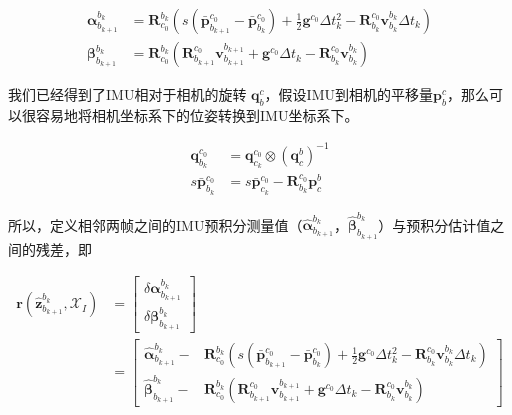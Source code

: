 \documentclass[12pt,a4paper]{article}
\begin{document}
\begin{equation}
\begin{aligned}
\boldsymbol{\alpha}^{b_{k}}_{b_{k+1}} 
&= 
\mathbf{R}^{b_{k}}_{c_{0}}
\left(
s(\bar{\mathbf{p}}^{c_{0}}_{b_{k+1}} - \bar{\mathbf{p}}^{c_{0}}_{b_{k}}) +
\frac{1}{2}\mathbf{g}^{c_{0}} \Delta t_{k}^{2} -
\mathbf{R}^{c_0}_{b_k} \mathbf{v}^{b_k}_{b_{k}} \Delta t_{k} 
\right) 
\\
\boldsymbol{\beta}^{b_{k}}_{b_{k+1}} &=
\mathbf{R}^{b_{k}}_{c_{0}}
\left(
\mathbf{R}^{c_0}_{b_{k+1}} \mathbf{v}^{b_{k+1}}_{b_{k+1}} +
\mathbf{g}^{c_{0}}\Delta t_{k} - \mathbf{R}^{c_0}_{b_k} \mathbf{v}^{b_k}_{b_{k}}
\right)
\end{aligned}
\end{equation}

我们已经得到了IMU相对于相机的旋转 $\mathbf{q}_{b}^{c}$，假设IMU到相机的平移量$\mathbf{p}_{b}^{c}$，那么可以很容易地将相机坐标系下的位姿转换到IMU坐标系下。

\begin{equation}
\begin{aligned}
\mathbf{q}_{b_{k}}^{c_{0}} &=
\mathbf{q}^{c_{0}}_{c_{k}} \otimes (\mathbf{q}_{c}^{b})^{-1}  \\
s \bar{\mathbf{p}}^{c_{0}}_{b_{k}} &=
s \bar{\mathbf{p}}^{c_{0}}_{c_{k}} - \mathbf{R}^{c_{0}}_{b_{k}} \mathbf{p}_{c}^{b}
\end{aligned}
\end{equation}

所以，定义相邻两帧之间的IMU预积分测量值（${\hat{\boldsymbol{\alpha}}}_{b_{k+1}}^{b_{k}}$，${\hat{\boldsymbol{\beta}}}_{b_{k+1}}^{b_{k}}$）与预积分估计值之间的残差，即

\begin{equation}
\begin{aligned}
\mathbf{r}(\hat{\mathbf{z}}^{b_{k}}_{b_{k+1}}, \mathcal{X}_I) 
&=
\begin{bmatrix}
\delta \boldsymbol{\alpha}^{b_{k}}_{b_{k+1}} \\
\delta \boldsymbol{\beta}^{b_{k}}_{b_{k+1}}
\end{bmatrix} \\ 
&=
\begin{bmatrix}
\hat{\boldsymbol{\alpha}}^{b_{k}}_{b_{k+1}} -& 
\mathbf{R}^{b_{k}}_{c_{0}}
\left(
s(\bar{\mathbf{p}}^{c_{0}}_{b_{k+1}} - \bar{\mathbf{p}}^{c_{0}}_{b_{k}}) +
\frac{1}{2}\mathbf{g}^{c_{0}} \Delta t_{k}^{2} -
\mathbf{R}^{c_0}_{b_k} \mathbf{v}^{b_k}_{b_{k}} \Delta t_{k} 
\right) \\
\hat{\boldsymbol{\beta}}^{b_{k}}_{b_{k+1}} -&
\mathbf{R}^{b_{k}}_{c_{0}}
\left(
\mathbf{R}^{c_0}_{b_{k+1}} \mathbf{v}^{b_{k+1}}_{b_{k+1}} +
\mathbf{g}^{c_{0}}\Delta t_{k} - \mathbf{R}^{c_0}_{b_k} \mathbf{v}^{b_k}_{b_{k}}
\right)
\end{bmatrix}
\end{aligned}
\end{equation}
\end{document}
